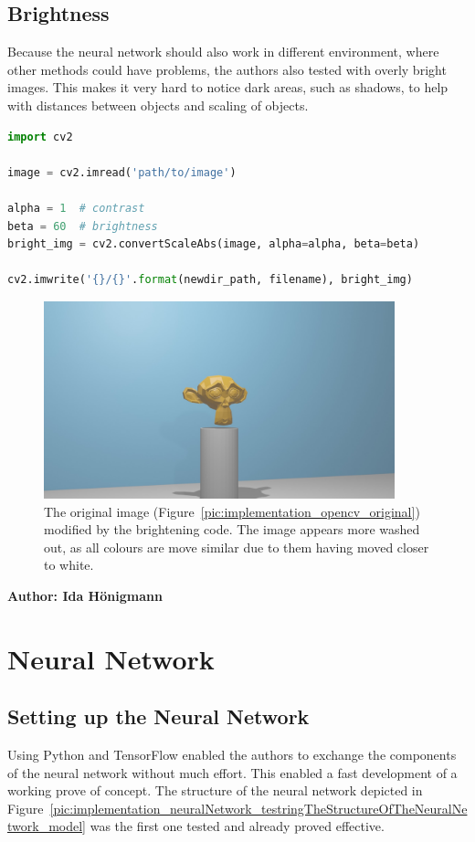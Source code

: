 \subsection{Brightness}
Because the neural network should also work in different environment, where other methods could have problems, the authors also tested with overly bright images. This makes it very hard to notice dark areas, such as shadows, to help with distances between objects and scaling of objects.

\begin{lstlisting}[language=python]
import cv2

image = cv2.imread('path/to/image')

alpha = 1  # contrast
beta = 60  # brightness
bright_img = cv2.convertScaleAbs(image, alpha=alpha, beta=beta)

cv2.imwrite('{}/{}'.format(newdir_path, filename), bright_img)
\end{lstlisting}

\begin{figure}[h!]
	\centering
	\includegraphics[width=4in]{img/implementation_opencv_brightness.jpg}
	\caption{The original image (Figure~\ref{pic:implementation_opencv_original}) modified by the brightening code. The image appears more washed out, as all colours are move similar due to them having moved closer to white.}
	\label{pic:implementation_opencv_brightness}
\end{figure}

\newpage

\vspace{5mm}
\noindent
\textbf{Author: Ida Hönigmann}

\section{Neural Network}
\label{sec:implementation_neural_network}
\subsection{Setting up the Neural Network}
Using Python and TensorFlow enabled the authors to exchange the components of the neural network without much effort. This enabled a fast development of a working prove of concept. The structure of the neural network depicted in Figure~\ref{pic:implementation_neuralNetwork_testringTheStructureOfTheNeuralNetwork_model} was the first one tested and already proved effective.

